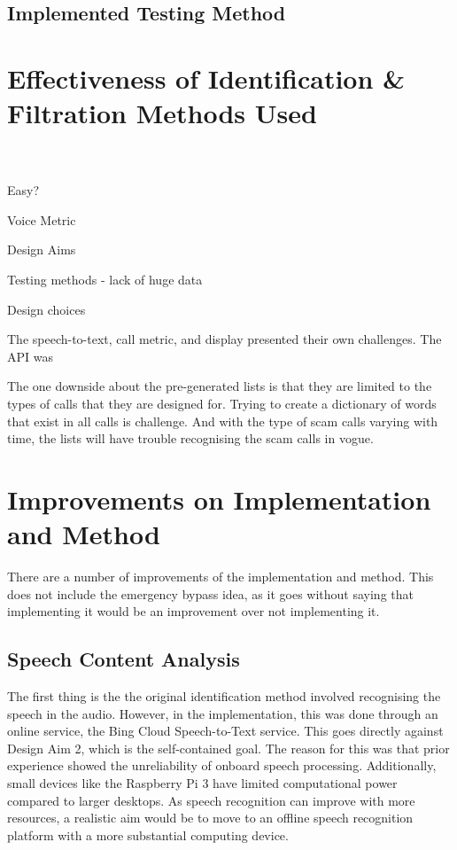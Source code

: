 \documentclass[main.tex]{subfiles}
\begin{document}
\subsection{Implemented Testing Method}


\section{Effectiveness of Identification \& Filtration Methods Used}


\hrulefill
\\\\

Easy?

Voice Metric

Design Aims

Testing methods - lack of huge data

Design choices

The speech-to-text, call metric, and display presented their own challenges. The API was


The one downside about the pre-generated lists is that they are limited to the types of calls that they are designed for. Trying to create a dictionary of words that exist in all calls is challenge. And with the type of scam calls varying with time, the lists will have trouble recognising the scam calls in vogue.

\section{Improvements on Implementation and Method}
There are a number of improvements of the implementation and method. This does not include the emergency bypass idea, as it goes without saying that implementing it would be an improvement over not implementing it.

\subsection{Speech Content Analysis}
The first thing is the the original identification method involved recognising the speech in the audio. However, in the implementation, this was done through an online service, the Bing Cloud Speech-to-Text service. This goes directly against Design Aim 2, which is the self-contained goal. The reason for this was that prior experience showed the unreliability of onboard speech processing. Additionally, small devices like the Raspberry Pi 3 have limited computational power compared to larger desktops. As speech recognition can improve with more resources, a realistic aim would be to move to an offline speech recognition platform with a more substantial computing device.
\end{document}
